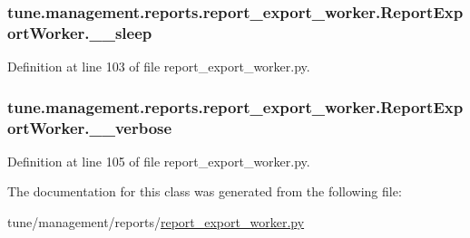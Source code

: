 \hypertarget{classtune_1_1management_1_1reports_1_1report__export__worker_1_1ReportExportWorker_af49d9582e87d273aeb98dd89fdddd6ef}{
\subsubsection[{\-\_\-\-\_\-sleep}]{\setlength{\rightskip}{0pt plus 5cm}tune.\-management.\-reports.\-report\-\_\-export\-\_\-worker.\-Report\-Export\-Worker.\-\_\-\-\_\-sleep\hspace{0.3cm}{\ttfamily [private]}}}\label{classtune_1_1management_1_1reports_1_1report__export__worker_1_1ReportExportWorker_af49d9582e87d273aeb98dd89fdddd6ef}


Definition at line 103 of file report\-\_\-export\-\_\-worker.\-py.

\hypertarget{classtune_1_1management_1_1reports_1_1report__export__worker_1_1ReportExportWorker_a06a086d2025a26d725ed44f0d3340c7a}{
\subsubsection[{\-\_\-\-\_\-verbose}]{\setlength{\rightskip}{0pt plus 5cm}tune.\-management.\-reports.\-report\-\_\-export\-\_\-worker.\-Report\-Export\-Worker.\-\_\-\-\_\-verbose\hspace{0.3cm}{\ttfamily [private]}}}\label{classtune_1_1management_1_1reports_1_1report__export__worker_1_1ReportExportWorker_a06a086d2025a26d725ed44f0d3340c7a}


Definition at line 105 of file report\-\_\-export\-\_\-worker.\-py.



The documentation for this class was generated from the following file\-:\begin{DoxyCompactItemize}
\item 
tune/management/reports/\hyperlink{report__export__worker_8py}{report\-\_\-export\-\_\-worker.\-py}\end{DoxyCompactItemize}
